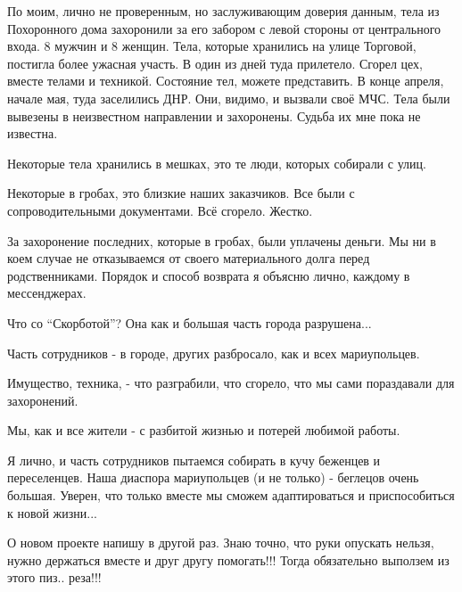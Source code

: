 По моим, лично не проверенным, но заслуживающим доверия данным, тела из
Похоронного дома захоронили за его забором с левой стороны от  центрального
входа. 8 мужчин и 8 женщин. Тела, которые хранились на улице Торговой,
постигла более ужасная участь. В один из дней туда прилетело. Сгорел
цех, вместе телами и техникой. Состояние тел, можете представить. В конце
апреля, начале мая, туда заселились ДНР. Они, видимо, и вызвали своё МЧС. Тела
были вывезены в неизвестном направлении и захоронены. Судьба их мне пока не
известна.

Некоторые тела хранились в мешках, это те люди, которых собирали с улиц.

Некоторые в гробах, это близкие наших заказчиков. Все были с сопроводительными
документами. Всё сгорело. Жестко.

За захоронение последних, которые в гробах, были уплачены деньги. Мы ни в коем
случае не отказываемся от своего материального долга перед родственниками.
Порядок и способ возврата я объясню лично, каждому в мессенджерах.

Что со \enquote{Скорботой}? Она как и большая часть города разрушена...    

Часть сотрудников - в городе, других разбросало, как и всех мариупольцев.

Имущество, техника, - что разграбили, что сгорело, что мы сами пораздавали для захоронений. 

Мы, как и все жители - с разбитой жизнью и потерей любимой работы.

Я лично, и часть сотрудников пытаемся собирать в кучу беженцев и
переселенцев. Наша диаспора мариупольцев (и не только) - беглецов очень
большая. Уверен, что только вместе мы сможем адаптироваться и приспособиться
к новой жизни...

О новом проекте напишу в другой раз.    Знаю точно, что руки опускать
нельзя, нужно держаться вместе и друг другу помогать!!!  Тогда обязательно
выползем из этого пиз.. реза!!!

